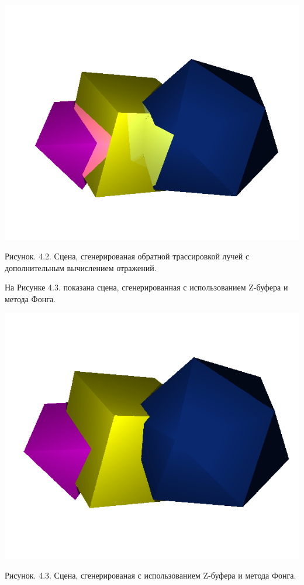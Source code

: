 \documentclass[12pt]{report}
\begin{document}
	\begin{center}
		\includegraphics[scale=0.8]{rto.png}
		
		Рисунок. 4.2. Сцена, сгенерированая обратной трассировкой лучей с дополнительным вычислением отражений.
	\end{center}

	На Рисунке 4.3. показана сцена, сгенерированная с использованием Z-буфера и метода Фонга.

	\begin{center}
		\includegraphics[scale=0.8]{gph.png}
		
		Рисунок. 4.3. Сцена, сгенерированая с использованием Z-буфера и метода Фонга.
	\end{center}
\end{document}

